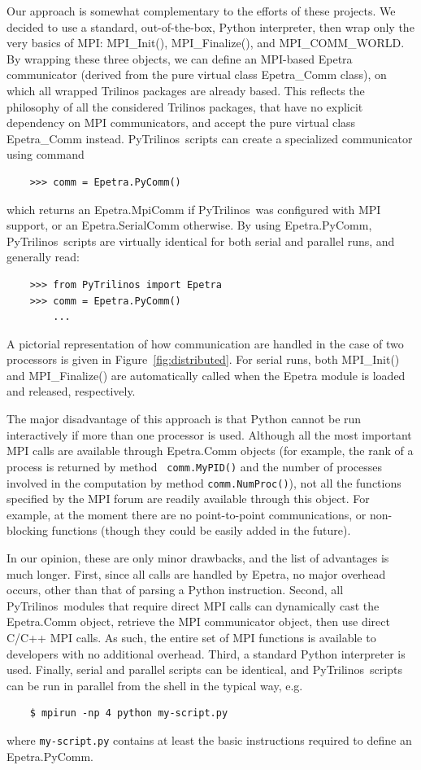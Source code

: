 \documentclass[acmtocl]{acmtrans2m}
\newcommand{\PyTrilinos}{{PyTrilinos}}
\begin{document}
Our approach is somewhat complementary to the efforts of these
projects.  We decided to use a standard, out-of-the-box, Python
interpreter, then wrap only the very basics of MPI: MPI\_Init(),
MPI\_Finalize(), and MPI\_COMM\_WORLD.  By wrapping these three
objects, we can define an MPI-based Epetra communicator (derived from
the pure virtual class Epetra\_Comm class), on which all wrapped
Trilinos packages are already based.  This reflects the philosophy of
all the considered Trilinos packages, that have no explicit dependency
on MPI communicators, and accept the pure virtual class Epetra\_Comm
instead.  \PyTrilinos\ scripts can create a specialized communicator
using command
\begin{verbatim}
    >>> comm = Epetra.PyComm()
\end{verbatim}
which returns an Epetra.MpiComm if \PyTrilinos\ was configured with
MPI support, or an Epetra.SerialComm otherwise.  By using
Epetra.PyComm, \PyTrilinos\ scripts are virtually identical for both
serial and parallel runs, and generally read:
\begin{verbatim}
    >>> from PyTrilinos import Epetra
    >>> comm = Epetra.PyComm()
        ...
\end{verbatim}
A pictorial representation of how communication are handled in the
case of two processors is given in Figure~\ref{fig:distributed}.  For
serial runs, both MPI\_Init() and MPI\_Finalize() are automatically
called when the Epetra module is loaded and released, respectively.

\smallskip

The major disadvantage of this approach is that Python cannot be run
interactively if more than one processor is used.  Although all the
most important MPI calls are available through Epetra.Comm objects
(for example, the rank of a process is returned by method {\tt
  comm.MyPID()} and the number of processes involved in the
computation by method {\tt comm.NumProc()}), not all the functions
specified by the MPI forum are readily available through this object.
For example, at the moment there are no point-to-point communications,
or non-blocking functions (though they could be easily added in the
future).

In our opinion, these are only minor drawbacks, and the list of
advantages is much longer.  First, since all calls are handled by
Epetra, no major overhead occurs, other than that of parsing a Python
instruction.  Second, all \PyTrilinos\ modules that require direct MPI
calls can dynamically cast the Epetra.Comm object, retrieve the MPI
communicator object, then use direct C/C++ MPI calls.  As such, the
entire set of MPI functions is available to developers with no
additional overhead.  Third, a standard Python interpreter is used.
Finally, serial and parallel scripts can be identical, and \PyTrilinos\
scripts can be run in parallel from the shell in the typical way, e.g.
\begin{verbatim}
    $ mpirun -np 4 python my-script.py
\end{verbatim}
where {\tt my-script.py} contains at least the basic instructions
required to define an Epetra.PyComm.
\end{document}
